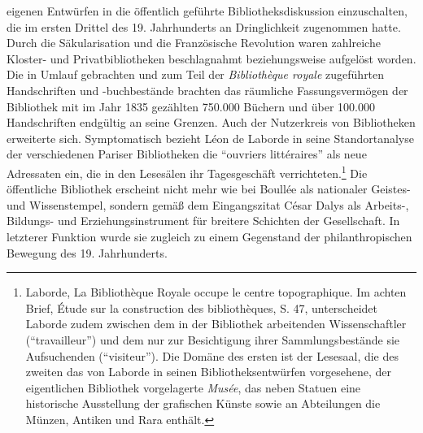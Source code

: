 eigenen Entwürfen in die öffentlich geführte Bibliotheksdiskussion
einzuschalten, die im ersten Drittel des 19. Jahrhunderts an
Dringlichkeit zugenommen hatte. Durch die Säkularisation und die
Französische Revolution waren zahlreiche Kloster- und Privatbibliotheken
beschlagnahmt beziehungsweise aufgelöst worden. Die in Umlauf gebrachten
und zum Teil der \emph{Bibliothèque royale} zugeführten Handschriften
und -buchbestände brachten das räumliche Fassungsvermögen der Bibliothek
mit im Jahr 1835 gezählten 750.000 Büchern und über 100.000
Handschriften endgültig an seine Grenzen. Auch der Nutzerkreis von
Bibliotheken erweiterte sich. Symptomatisch bezieht Léon de Laborde in
seine Standortanalyse der verschiedenen Pariser Bibliotheken die
\enquote{ouvriers littéraires} als neue Adressaten ein, die in den
Lesesälen ihr Tagesgeschäft verrichteten.\footnote{Laborde, La
  Bibliothèque Royale occupe le centre topographique. Im achten Brief,
  Étude sur la construction des bibliothèques, S. 47, unterscheidet
  Laborde zudem zwischen dem in der Bibliothek arbeitenden
  Wissenschaftler (\enquote{travailleur}) und dem nur zur Besichtigung
  ihrer Sammlungsbestände sie Aufsuchenden (\enquote{visiteur}). Die
  Domäne des ersten ist der Lesesaal, die des zweiten das von Laborde in
  seinen Bibliotheksentwürfen vorgesehene, der eigentlichen Bibliothek
  vorgelagerte \emph{Musée}, das neben Statuen eine historische
  Ausstellung der grafischen Künste sowie an Abteilungen die Münzen,
  Antiken und Rara enthält.} Die öffentliche Bibliothek erscheint nicht
mehr wie bei Boullée als nationaler Geistes- und Wissenstempel, sondern
gemäß dem Eingangszitat César Dalys als Arbeits-, Bildungs- und
Erziehungsinstrument für breitere Schichten der Gesellschaft. In
letzterer Funktion wurde sie zugleich zu einem Gegenstand der
philanthropischen Bewegung des 19. Jahrhunderts.

